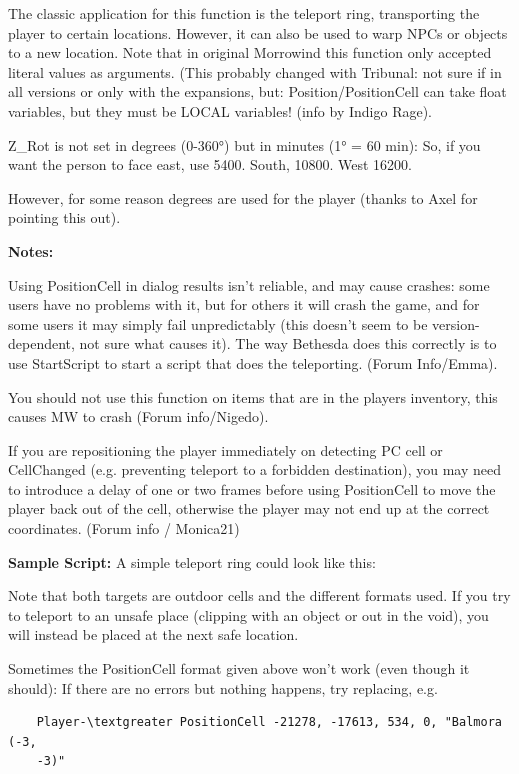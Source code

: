 The classic application for this function is the teleport ring,
transporting the player to certain locations. However, it can also be
used to warp NPCs or objects to a new location. Note that in original
Morrowind this function only accepted literal values as arguments. (This
probably changed with Tribunal: not sure if in all versions or only with
the expansions, but: Position/PositionCell can take float variables, but
they must be LOCAL variables! (info by Indigo Rage).

Z\_Rot is not set in degrees (0-360°) but in minutes (1° = 60 min): So,
if you want the person to face east, use 5400. South, 10800. West 16200.

However, for some reason degrees are used for the player (thanks to Axel
for pointing this out).

\textbf{Notes:}

Using PositionCell in dialog results isn't reliable, and may cause
crashes: some users have no problems with it, but for others it will
crash the game, and for some users it may simply fail unpredictably
(this doesn't seem to be version-dependent, not sure what causes it).
The way Bethesda does this correctly is to use StartScript to start a
script that does the teleporting. (Forum Info/Emma).

You should not use this function on items that are in the players
inventory, this causes MW to crash (Forum info/Nigedo).

If you are repositioning the player immediately on detecting PC cell or
CellChanged (e.g. preventing teleport to a forbidden destination), you
may need to introduce a delay of one or two frames before using
PositionCell to move the player back out of the cell, otherwise the
player may not end up at the correct coordinates. (Forum info /
Monica21)

\textbf{Sample Script:} A simple teleport ring could look like this:



Note that both targets are outdoor cells and the different formats used.
If you try to teleport to an unsafe place (clipping with an object or
out in the void), you will instead be placed at the next safe location.

Sometimes the PositionCell format given above won't work (even though it
should): If there are no errors but nothing happens, try replacing, e.g.

\begin{lstlisting}
	Player-\textgreater PositionCell -21278, -17613, 534, 0, "Balmora (-3,
	-3)"
\end{lstlisting}


